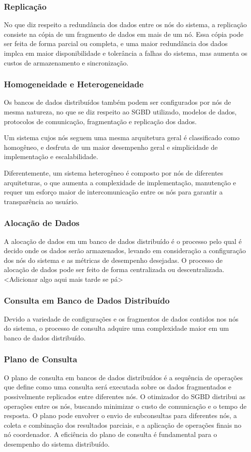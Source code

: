 \subsubsection{Replicação}
No que diz respeito a redundância dos dados entre os nós do sistema,
a replicação consiste na cópia de um fragmento de dados em mais de um nó. 
Essa cópia pode ser feita de forma parcial ou completa, e uma maior redundância dos dados 
implca em maior disponibilidade e tolerância a falhas do sistema, mas aumenta os custos de armazenamento e sincronização.

\subsubsection{Homogeneidade e Heterogeneidade}
Os bancos de dados distribuídos também podem ser configurados por nós de mesma natureza,
no que se diz respeito ao SGBD utilizado, modelos de dados, protocolos de comunicação,
fragmentação e replicação dos dados. 

Um sistema cujos nós seguem uma mesma arquitetura geral é classificado como homogêneo, 
e desfruta de um maior desempenho geral e simplicidade de implementação e escalabilidade.

Diferentemente, um sistema heterogêneo é composto por nós de diferentes arquiteturas,
o que aumenta a complexidade de implementação, manutenção e requer um esforço maior
de intercomunicação entre os nós para garantir a transparência ao usuário. 

\subsubsection{Alocação de Dados}
A alocação de dados em um banco de dados distribuído é o processo pelo qual é decido onde os dados serão armazenados,
levando em consideração a configuração dos nós do sistema e as métricas de desempenho desejadas.
O processo de alocação de dados pode ser feito de forma centralizada ou descentralizada.
<Adicionar algo aqui mais tarde se pá>

\subsubsection{Consulta em Banco de Dados Distribuído}
Devido a variedade de configurações e os fragmentos de dados contidos nos nós do sistema,
o processo de consulta adquire uma complexidade maior em um banco de dados distribuído.

\subsubsection{Plano de Consulta}
O plano de consulta em bancos de dados distribuídos é a sequência de operações que define como uma consulta será executada 
sobre os dados fragmentados e possivelmente replicados entre diferentes nós.
O otimizador do SGBD distribui as operações entre os nós, buscando minimizar o custo de comunicação e o tempo de resposta. 
O plano pode envolver o envio de subconsultas para diferentes nós, a coleta e combinação dos resultados parciais, e a aplicação de operações finais no nó coordenador.
A eficiência do plano de consulta é fundamental para o desempenho do sistema distribuído.

